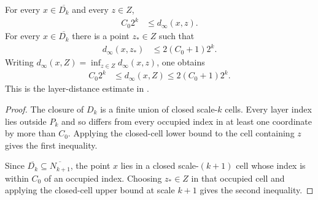 \begin{lemma}
    \label{thm:area_law_dyadic_layer_distance}
    \leanok
    For every $x\in\overline{D_k}$ and every $z\in Z$,
    \begin{align}
        C_0 2^k & \le d_\infty(x,z).
    \end{align}
    For every $x\in\overline{D_k}$ there is a point $z_*\in Z$ such that
    \begin{align}
        d_\infty(x,z_*) & \le 2(C_0+1)2^k.
    \end{align}
    Writing $d_\infty(x,Z)=\inf_{z\in Z}d_\infty(x,z)$, one obtains
    \begin{align}
        C_0 2^k & \le d_\infty(x,Z) \le 2(C_0+1)2^k.
    \end{align}
    This is the layer-distance estimate in
    \cite[Section~11]{OpenAI2026AreaLaw}.
\end{lemma}
\begin{proof}\leanok
    The closure of $D_k$ is a finite union of closed scale-$k$ cells.
    Every layer index lies outside $P_k$ and so differs from every occupied
    index in at least one coordinate by more than $C_0$. Applying the
    closed-cell lower bound to the cell containing $z$ gives the first
    inequality.

    Since $\overline{D_k}\subseteq\overline{N_{k+1}}$, the point $x$ lies in a
    closed scale-$(k+1)$ cell whose index is within $C_0$ of an occupied index.
    Choosing $z_*\in Z$ in that occupied cell and applying the closed-cell
    upper bound at scale $k+1$ gives the second inequality.
\end{proof}

